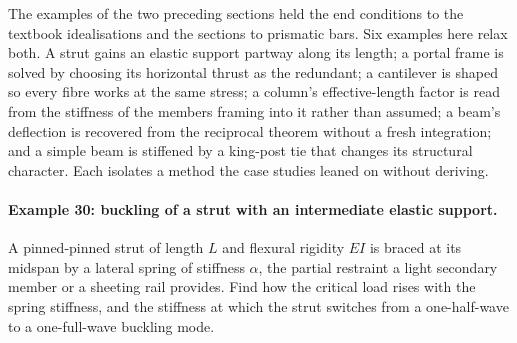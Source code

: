 The examples of the two preceding sections held the end conditions to the
textbook idealisations and the sections to prismatic bars. Six examples
here relax both. A strut gains an elastic support partway along its
length; a portal frame is solved by choosing its horizontal thrust as the
redundant; a cantilever is shaped so every fibre works at the same stress;
a column's effective-length factor is read from the stiffness of the
members framing into it rather than assumed; a beam's deflection is
recovered from the reciprocal theorem without a fresh integration; and a
simple beam is stiffened by a king-post tie that changes its structural
character. Each isolates a method the case studies leaned on without
deriving.

\paragraph{Example 30: buckling of a strut with an intermediate elastic
support.} A pinned-pinned strut of length $L$ and flexural rigidity $EI$
is braced at its midspan by a lateral spring of stiffness $\alpha$, the
partial restraint a light secondary member or a sheeting rail provides.
Find how the critical load rises with the spring stiffness, and the
stiffness at which the strut switches from a one-half-wave to a
one-full-wave buckling mode.


